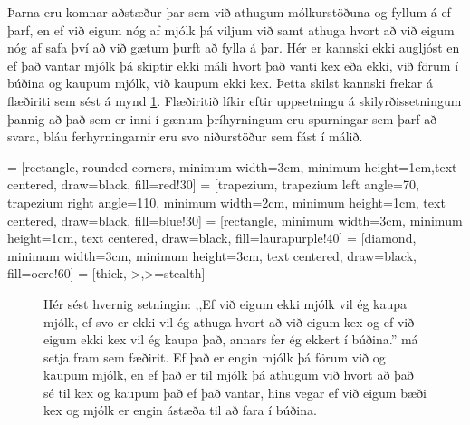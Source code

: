 Þarna eru komnar aðstæður þar sem við athugum mólkurstöðuna og fyllum á ef þarf, en ef við eigum nóg af mjólk þá viljum við samt athuga hvort að við eigum nóg af safa því að við gætum þurft að fylla á þar.
Hér er kannski ekki augljóst en ef það vantar mjólk þá skiptir ekki máli hvort það vanti kex eða ekki, við förum í búðina og kaupum mjólk, við kaupum ekki kex.
Þetta skilst kannski frekar á flæðiriti sem sést á mynd \ref{fig:flæðirit}.
Flæðiritið líkir eftir uppsetningu á skilyrðissetningum þannig að það sem er inni í gænum þríhyrningum eru spurningar sem þarf að svara, bláu ferhyrningarnir eru svo niðurstöður sem fást í málið.

 = [rectangle, rounded corners, minimum width=3cm, minimum height=1cm,text centered, draw=black, fill=red!30]
 = [trapezium, trapezium left angle=70, trapezium right angle=110, minimum width=2cm, minimum height=1cm, text centered, draw=black, fill=blue!30]
 = [rectangle, minimum width=3cm, minimum height=1cm, text centered, draw=black, fill=laurapurple!40]
 = [diamond, minimum width=3cm, minimum height=3cm, text centered, draw=black, fill=ocre!60]
 = [thick,->,>=stealth]

\vspace{5pt}
\begin{figure}[H]
	\centering
{}
\caption{Hér sést hvernig setningin: ,,Ef við eigum ekki mjólk vil ég kaupa mjólk, ef svo er ekki vil ég athuga hvort að við eigum kex og ef við eigum ekki kex vil ég kaupa það, annars fer ég ekkert í búðina.'' má setja fram sem fæðirit. Ef það er engin mjólk þá förum við og kaupum mjólk, en ef það er til mjólk þá athugum við hvort að það sé til kex og kaupum það ef það vantar, hins vegar ef við eigum bæði kex og mjólk er engin ástæða til að fara í búðina.}
\label{fig:flæðirit}
\end{figure}

